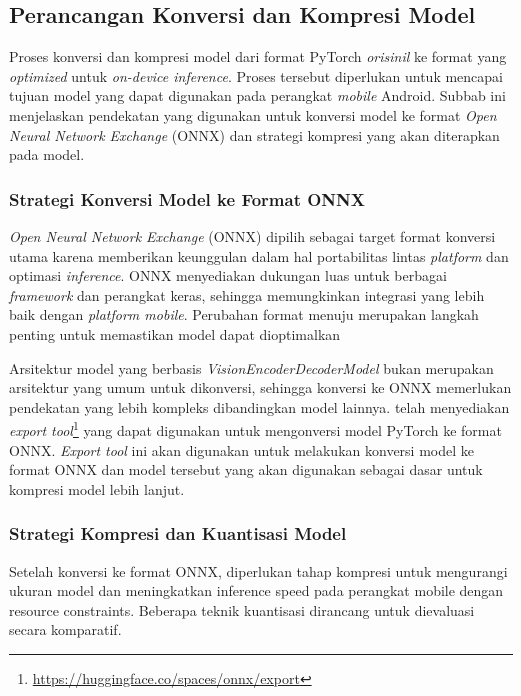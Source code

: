 \subsection{Perancangan Konversi dan Kompresi Model}
\label{subsec:perancangan-konversi-dan-kompresi-model}

 Proses konversi dan kompresi model \donut{} dari format PyTorch \emph{orisinil} ke format yang \emph{optimized} untuk \emph{on-device inference}. Proses tersebut diperlukan untuk mencapai tujuan model yang dapat digunakan pada perangkat \emph{mobile} Android. Subbab ini menjelaskan pendekatan yang digunakan untuk konversi model ke format \emph{Open Neural Network Exchange} (ONNX) dan strategi kompresi yang akan diterapkan pada model.

\subsubsection{Strategi Konversi Model ke Format ONNX}
\label{subsubsec:strategi-konversi-onnx}

\emph{Open Neural Network Exchange} (ONNX) dipilih sebagai target format konversi utama karena memberikan keunggulan dalam hal portabilitas lintas \emph{platform} dan optimasi \emph{inference}. ONNX menyediakan dukungan luas untuk berbagai \emph{framework} dan perangkat keras, sehingga memungkinkan integrasi yang lebih baik dengan \emph{platform mobile}. Perubahan format menuju \onnx{} merupakan langkah penting untuk memastikan model dapat dioptimalkan 

Arsitektur model \donut{} yang berbasis \textit{VisionEncoderDecoderModel} bukan merupakan arsitektur yang umum untuk dikonversi, sehingga konversi ke ONNX memerlukan pendekatan yang lebih kompleks dibandingkan model lainnya. \onnx{} telah menyediakan \emph{export tool}{}\footnote{\url{https://huggingface.co/spaces/onnx/export}} yang dapat digunakan untuk mengonversi model PyTorch ke format ONNX. \emph{Export tool} ini akan digunakan untuk melakukan konversi model \donut{} ke format ONNX dan model tersebut yang akan digunakan sebagai dasar untuk kompresi model lebih lanjut.

\subsubsection{Strategi Kompresi dan Kuantisasi Model}
\label{subsubsec:strategi-kompresi-kuantisasi}

Setelah konversi ke format ONNX, diperlukan tahap kompresi untuk mengurangi ukuran model dan meningkatkan inference speed pada perangkat mobile dengan resource constraints. Beberapa teknik kuantisasi dirancang untuk dievaluasi secara komparatif.

